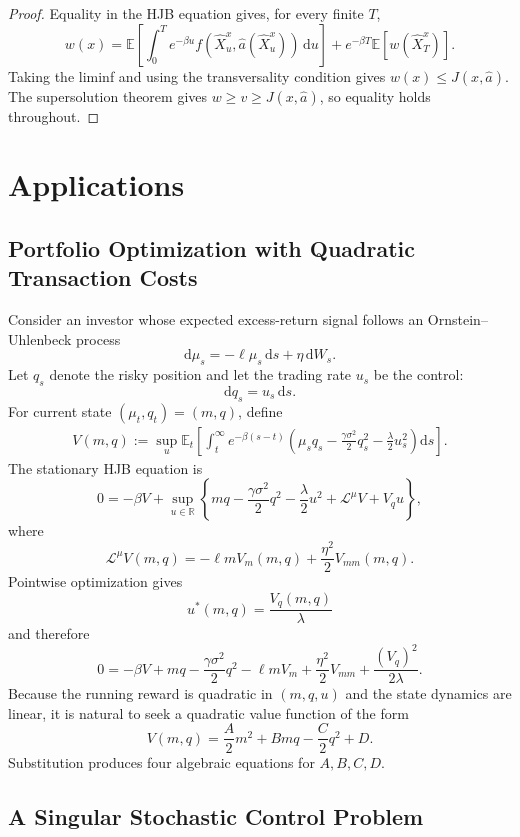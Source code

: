 \begin{proof}
Equality in the HJB equation gives, for every finite \(T\),
\[
w(x)
=\mathbb E\!\left[
\int_0^T e^{-\beta u}
 f(\hat X_u^x,\hat a(\hat X_u^x))\,\mathrm du
\right]
+e^{-\beta T}\mathbb E[w(\hat X_T^x)].
\]
Taking the liminf and using the transversality condition gives \(w(x)\le J(x,\hat a)\). The supersolution theorem gives \(w\ge v\ge J(x,\hat a)\), so equality holds throughout.
\end{proof}

\section{Applications}

\subsection{Portfolio Optimization with Quadratic Transaction Costs}

Consider an investor whose expected excess-return signal follows an Ornstein--Uhlenbeck process
\[
\mathrm d\mu_s=-\ell\mu_s\,\mathrm ds+\eta\,\mathrm dW_s.
\]
Let \(q_s\) denote the risky position and let the trading rate \(u_s\) be the control:
\[
\mathrm dq_s=u_s\,\mathrm ds.
\]
For current state \((\mu_t,q_t)=(m,q)\), define
\[
\begin{aligned}
V(m,q)
:=\sup_u\mathbb E_t\!\left[
\int_t^\infty e^{-\beta(s-t)}
\left(
\mu_sq_s
-\frac{\gamma\sigma^2}{2}q_s^2
-\frac{\lambda}{2}u_s^2
\right)\mathrm ds
\right].
\end{aligned}
\]
The stationary HJB equation is
\[
0=-\beta V
+\sup_{u\in\mathbb R}
\left\{
 mq-\frac{\gamma\sigma^2}{2}q^2
-\frac{\lambda}{2}u^2
+\mathcal L^\mu V
+V_qu
\right\},
\]
where
\[
\mathcal L^\mu V(m,q)
=-\ell mV_m(m,q)
+\frac{\eta^2}{2}V_{mm}(m,q).
\]
Pointwise optimization gives
\[
u^*(m,q)=\frac{V_q(m,q)}{\lambda}
\]
and therefore
\[
0=-\beta V
+mq-\frac{\gamma\sigma^2}{2}q^2
-\ell mV_m
+\frac{\eta^2}{2}V_{mm}
+\frac{(V_q)^2}{2\lambda}.
\]
Because the running reward is quadratic in \((m,q,u)\) and the state dynamics are linear, it is natural to seek a quadratic value function of the form
\[
V(m,q)
=\frac A2m^2+Bmq-\frac C2q^2+D.
\]
Substitution produces four algebraic equations for \(A,B,C,D\).

\subsection{A Singular Stochastic Control Problem}

